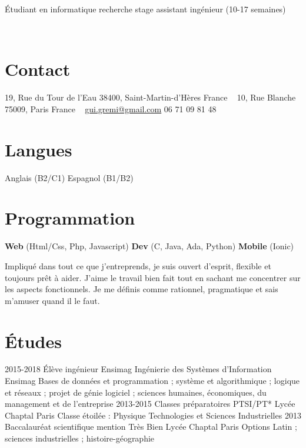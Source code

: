 \documentclass[]{friggeri-cv}
\begin{document}
       {\'Etudiant en informatique recherche stage assistant ingénieur (10-17 semaines)}


\begin{aside}
    \centerline{}~
    \section{Contact}
        19, Rue du Tour de l'Eau
        38400, Saint-Martin-d'Hères
        France
        ~
        10, Rue Blanche
        75009, Paris
        France
        ~
        \href{mailto:gui.gremi@gmail.com}{gui.gremi@gmail.com}
        06 71 09 81 48
    \section{Langues}
        Anglais (B2/C1)
        Espagnol (B1/B2)
    \section{Programmation}
        \textbf{Web}
        (Html/Css, Php, Javascript)
        \textbf{Dev}
        (C, Java, Ada, Python)
        \textbf{Mobile}
        (Ionic)
\end{aside}
    Impliqué dans tout ce que j’entreprends, je suis ouvert d’esprit, flexible et toujours prêt à aider. J’aime le travail bien fait tout en sachant me concentrer sur les aspects fonctionnels. Je me définis comme rationnel, pragmatique et sais m’amuser quand il le faut.

\section{\'Etudes}
\begin{entrylist}
    \entry
        {2015-2018}
        {\'Elève ingénieur Ensimag {\normalfont Ingénierie des Systèmes d'Information}}
        {Ensimag}
        {Bases de données et programmation ; système et algorithmique ; logique et réseaux ; projet de génie logiciel ; sciences humaines, économiques, du management et de l’entreprise}
    \entry
        {2013-2015}
        {Classes préparatoires PTSI/PT*}
        {Lycée Chaptal Paris}
        {Classe étoilée : Physique Technologies et Sciences Industrielles}
    \entry
        {2013}
        {Baccalauréat scientifique mention Très Bien}
        {Lycée Chaptal Paris}
        {Options Latin ; sciences industrielles ; histoire-géographie}
\end{entrylist}
\end{document}

